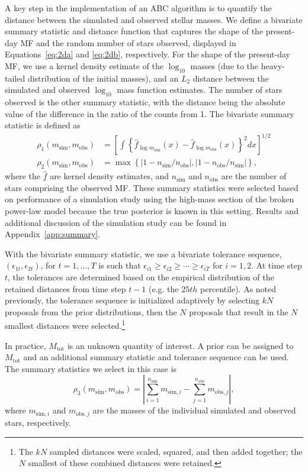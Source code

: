 \documentclass[ejs]{imsart}
\numberwithin{equation}{section}
\theoremstyle{plain}
\newcommand{\msim}{m_{\text{sim}}}
\newcommand{\mobs}{m_{\text{obs}}}
\newcommand{\nsim}{n_{\text{sim}}}
\newcommand{\nobs}{n_{\text{obs}}}
\newcommand{\Mtot}{M_{\text{tot}}}
\begin{document}
A key step in the implementation of an ABC algorithm is to quantify the distance between the simulated and observed stellar masses.  We define a bivariate summary statistic and distance function that captures the shape of the present-day MF and the random number of stars observed, displayed in Equations~\eqref{eq:2da} and \eqref{eq:2db}, respectively.  For the shape of the present-day MF, we use a kernel density estimate of the $\log_{10}$ masses (due to the heavy-tailed distribution of the initial masses), and an $L_2$ distance between the simulated and observed $\log_{10}$ mass function estimates.  The number of stars observed is the other summary statistic, with the distance being the absolute value of the difference in the ratio of the counts from 1. The bivariate summary statistic is defined as
\begin{align}
\rho_1(\msim, \mobs) &= \left [\displaystyle \int \left \{\hat f_{\log \msim}(x) - \hat f_{\log \mobs}(x) \right \}^2 dx \right]^{1/2} \label{eq:2da} \\ 
\rho_2(\msim, \mobs) &= \max\left\{\left|1 - \nsim/ \nobs\right |, \left|1 - \nobs/ \nsim\right |  \right\} \text{,}   \label{eq:2db}
\end{align}
where the $\hat f$ are kernel density estimates, and $\nsim$ and $\nobs$ are the number of stars comprising the observed MF.  These summary statistics were selected based on performance of a simulation study using the high-mass section of the broken power-law model because the true posterior is known in this setting.  Results and additional discussion of the simulation study can be found in Appendix~\ref{app:summary}.

With the bivariate summary statistic, we use a bivariate tolerance sequence, $(\epsilon_{1t}, \epsilon_{2t})$, for $t = 1, \ldots, T$ is such that $\epsilon_{i1} \geq \epsilon_{i2} \geq \cdots \geq \epsilon_{iT}$ for $i = 1, 2$.  At time step $t$, the tolerances are determined based on the  empirical distribution of the retained distances from time step $t-1$ (e.g. the $25th$ percentile).  As noted previously, the tolerance sequence is initialized adaptively by selecting $kN$ proposals from the prior distributions, then the $N$ proposals that result in the $N$ smallest distances were selected.\footnote{The $kN$ sampled distances were scaled, squared, and then added together; the $N$ smallest of these combined distances were retained.}

In practice, $\Mtot$ is an unknown quantity of interest.  A prior can be assigned to $\Mtot$ and an additional summary statistic and tolerance sequence can be used.  The summary statistics we select in this case is
\begin{equation}
\rho_3(\msim, \mobs) = \left| \sum_{i = 1}^{\nsim} m_{\text{sim}, i} - \sum_{j = 1}^{\nobs} m_{\text{obs}, j} \right|, \label{eq:2dc}
\end{equation}
where $m_{\text{sim}, i}$ and $m_{\text{obs}, j}$ are the masses of the individual simulated and observed stars, respectively.  
\end{document}
